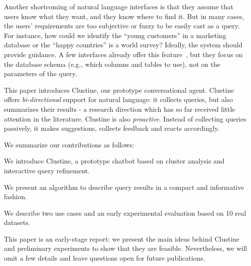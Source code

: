Another shortcoming of natural language interfaces is that they assume that
users know what they want, and they know where to find it. But in many cases,
the users' requirements are too subjective or fuzzy to be easily cast as a
query. For instance, how could we identify the ``young customers'' in a
marketing database or the ``happy countries'' is a world survey? Ideally, the
system should provide guidance. A few interfaces already offer this
feature~\cite{li2014constructing}, but they focus on the database schema (e.g.,
which columns and tables to use), not on the parameters of the query.

This paper introduces Clustine, our prototype conversational agent. Clustine
offers \emph{bi-directional} support for natural language: it collects queries,
but also summarizes their results - a research direction which has so far
received little attention in the literature. Clustine is also \emph{proactive}.
Instead of collecting queries passively, it makes suggestions, collects
feedback and reacts accordingly.

We summarize our contributions as follows:
\begin{itemize0}
    \item We introduce Clustine, a prototype chatbot based on cluster analysis
        and interactive query refinement.
    \item We present an algorithm to describe query results in a compact and
        informative fashion.
    \item We describe two use cases and an early experimental evaluation based
        on 10 real datasets.
\end{itemize0}

This paper is an early-stage report: we present the main ideas behind Clustine
and preliminary experiments to show that they are feasible.  Nevertheless, we
will omit a few details and leave questions open for future publications. 

